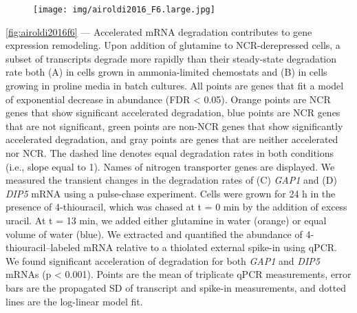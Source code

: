 {
\begin{figure}[h!]
  \vspace{0pt}
  \SingleSpacing
  \texttt{[image: img/airoldi2016\_F6.large.jpg]}
  \vspace{0pt}
  \textcolor{white}{
    \caption{\label{fig:airoldi2016f6}}
  }
  \vspace{-50pt}
\end{figure}
\begin{framed}
\noindent
\autoref{fig:airoldi2016f6} ---
Accelerated mRNA degradation contributes
to gene expression remodeling. Upon addition of glutamine to
NCR-derepressed cells, a subset of transcripts degrade more rapidly
than their steady-state degradation rate both (A) in cells grown in
ammonia-limited chemostats and (B) in cells growing in proline media
in batch cultures. All points are genes that fit a model of
exponential decrease in abundance (FDR < 0.05). Orange points are NCR
genes that show significant accelerated degradation, blue points are
NCR genes that are not significant, green points are non-NCR genes
that show significantly accelerated degradation, and gray points are
genes that are neither accelerated nor NCR. The dashed line denotes
equal degradation rates in both conditions (i.e., slope equal to 1).
Names of nitrogen transporter genes are displayed. We measured the
transient changes in the degradation rates of (C) \textit{GAP1} and (D) \textit{DIP5}
mRNA using a pulse-chase experiment. Cells were grown for 24 h in the
presence of 4-thiouracil, which was chased at t = 0 min by the
addition of excess uracil. At t = 13 min, we added either glutamine in
water (orange) or equal volume of water (blue). We extracted and
quantified the abundance of 4-thiouracil–labeled mRNA relative to a
thiolated external spike-in using qPCR. We found significant
acceleration of degradation for both \textit{GAP1} and \textit{DIP5} mRNAs (p < 0.001).
Points are the mean of triplicate qPCR measurements, error bars are
the propagated SD of transcript and spike-in measurements, and dotted
lines are the log-linear model fit.  
\end{framed}
}


